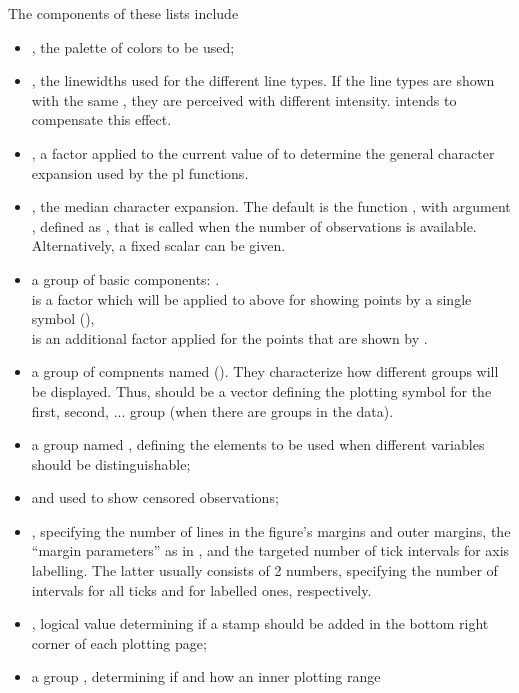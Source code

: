 \documentclass[11pt]{article}\usepackage[]{graphicx}\usepackage[]{color}
\begin{document}
The components of these lists include
\begin{itemize}
\item 
  , the palette of colors to be used;
\item
  , the linewidths used for the different line types.
  If the line types are shown with the same , they are perceived
  with different intensity.  intends to compensate this effect.
\item
  , a factor applied to the current value of  to
  determine the general character expansion used by the pl functions.
\item
  , the median character expansion.
  The default is the function , with argument , defined as
  , that is called when the number  of
  observations is available. Alternatively, a fixed scalar can be given.
\item
  a group of basic components:
  .\\
   is a factor which will be applied to  above for
  showing points by a single symbol (),\\
   is an additional factor applied for the points that
  are shown by .
\item
  a group of compnents named  ().
  They characterize how different groups will be displayed.
  Thus,  should be a vector defining the plotting symbol
  for the first, second, ... group (when there are groups in the data).
\item
  a group named , 
  defining the elements to be used when different variables should be
  distinguishable;
\item
   and  used to show censored observations;
\item
  , specifying the number of lines in the
  figure's margins and outer margins, the ``margin parameters'' as in
  , and the targeted number of tick intervals for axis labelling.
  The latter usually consists of 2 numbers, specifying the number of
  intervals for all ticks and for labelled ones, respectively. 
\item
  , logical value determining if a stamp should be added in the
  bottom right corner of each plotting page;
\item
  a group , determining if and how an inner plotting range

\end{itemize}
\end{document}
